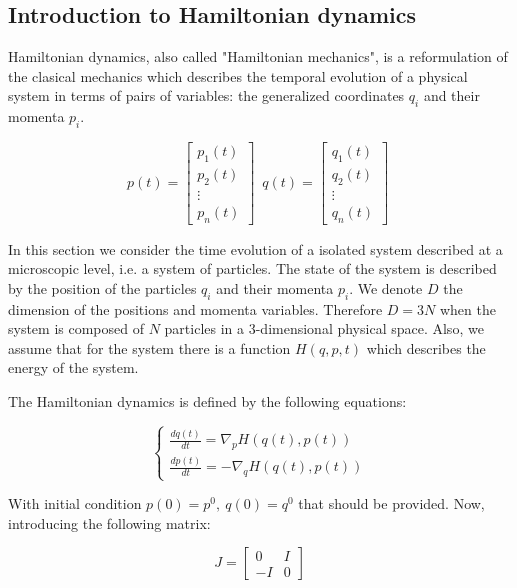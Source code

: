 \documentclass{article}
\begin{document}
\subsection{Introduction to Hamiltonian dynamics}
\label{sec:introduction_hamiltonian_dynamics}

Hamiltonian dynamics, also called "Hamiltonian mechanics", is a reformulation of the clasical mechanics which describes the temporal evolution of a physical system in terms of pairs of variables: the generalized coordinates \(q_i\) and their momenta \(p_i\).

\begin{equation*}
	p(t) = \begin{bmatrix} p_1(t) \\ p_2(t) \\ \vdots \\ p_n(t) \end{bmatrix} \; \ 
	q(t) = \begin{bmatrix} q_1(t) \\ q_2(t) \\ \vdots \\ q_n(t) \end{bmatrix} \;
\end{equation*}

In this section we consider the time evolution of a isolated system described at a microscopic level, i.e. a system of particles. The state of the system is described by the position of the particles \(q_i\) and their momenta \(p_i\). We denote \(D\) the dimension of the positions and momenta variables. Therefore \(D = 3N\) when the system is composed of \(N\) particles in a 3-dimensional physical space. Also, we assume that for the system there is a function \(H(q,p,t)\) which describes the energy of the system.

The Hamiltonian dynamics is defined by the following equations:

\begin{equation} 
	\label{eq:hamiltoniandynamics1} 
	\begin{cases}
		\frac{dq(t)}{dt} = \nabla_p H(q(t), p(t)) \\
		\frac{dp(t)}{dt} = -\nabla_q H(q(t), p(t))
	\end{cases}
\end{equation}

With initial condition \(p(0)=p^0, \ q(0)=q^0\) that should be provided. Now, introducing the following matrix:

\begin{equation*}
	J = \begin{bmatrix} 0 & I \\ -I & 0 \end{bmatrix}
\end{equation*}
\end{document}
